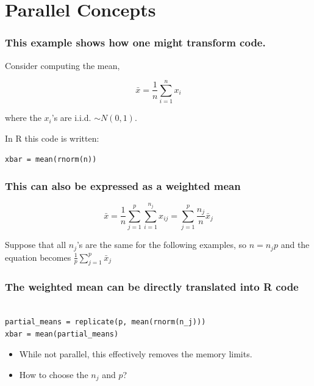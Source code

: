 \documentclass{beamer}
\begin{document}
\section{Parallel Concepts}
\begin{frame}[fragile]

\frametitle{This example shows how one might transform code.}

Consider computing the mean,

\begin{equation}
    \bar{x} = \frac{1}{n} \sum_{i = 1}^n x_i
\label{eq:mean}
\end{equation}

where the $x_i$'s are i.i.d. $\sim N(0, 1)$. 
    
In R this code is written:

\begin{verbatim}
xbar = mean(rnorm(n))
\end{verbatim}


\end{frame}
\begin{frame}

    \frametitle{This can also be expressed as a weighted mean}

\begin{equation}
    \bar{x} = \frac{1}{n} \sum_{j = 1}^p \sum_{i = 1}^{n_j} x_{ij}
    = \sum_{j = 1}^p \frac{n_j}{n} \bar{x}_j
\label{eq:mean_partial}
\end{equation}

Suppose that all $n_j$'s are the same for the following examples, so $n =
    n_j p$ and the equation becomes $\frac{1}{p} \sum_{j = 1}^p \bar{x}_j$

\end{frame}
\begin{frame}[fragile]

    \frametitle{The weighted mean can be directly translated into R code}

\begin{verbatim}

partial_means = replicate(p, mean(rnorm(n_j)))
xbar = mean(partial_means)

\end{verbatim}

\pause 

    \begin{itemize}
        \item While not parallel, this effectively removes the memory limits.
        \item How to choose the $n_j$ and $p$?
    \end{itemize}

\end{frame}
\end{document}
